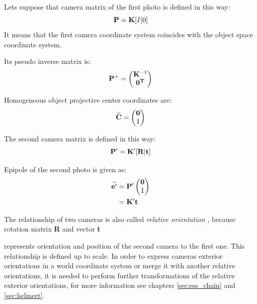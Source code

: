 \documentclass[a4paper,12pt]{article}
\newcommand{\ematr}[1]{%
{\bf #1}%
}
\newcommand{\evect}[1]{%
{\bf #1}%
}
\newcommand{\ehvect}[1]{%
{\bf \widetilde{#1}}%
}
\newcommand{\term}[1]{%
{\it #1}%
}
\begin{document}

Lets suppose that camera matrix of the first photo is defined in this way:
\begin{equation}
\ematr{P}  = \ematr{K} \ematr{[}I|0\ematr{]}
\end{equation}
It means that the first camera coordinate system coincides with  the object space coordinate 
system.

Its pseudo inverse matrix is:
\begin{equation}
\label{eq:rel_or_inv_cam1}
\ematr{P}^{+} =
\begin{pmatrix}
   \ematr{K}^{-1} \\
   \evect{0^{T}} \\
\end{pmatrix}
\end{equation}

Homogeneous object projective center coordinates are:
\begin{equation}
\label{eq:c1}
\ehvect{C} =
\begin{pmatrix}
   \evect{0} \\
    1 \\
\end{pmatrix}
\end{equation}

The second camera matrix is defined in this way:
\begin{equation}
\label{eq:rel_or_cam2}
\ematr{P}'  = \ematr{K}' \ematr{[}\ematr{R}|\evect{t}\ematr{]}
\end{equation}


Epipole of the second photo is given as:
\begin{equation}
\begin{split}
\label{eg:second_epipole}
\ehvect{e'} &=  \ematr{P'}
\begin{pmatrix}
   \evect{0} \\
    1 \\
\end{pmatrix} \\
&= \ematr{K}' \evect{t}\\
\end{split}
\end{equation}

The relationship of two cameras is also called \term{relative orientation}, because rotation matrix \ematr{R} and vector \evect{t}
represents orientation and position of the second camera to the first one. This relationship is defined up to scale.
In order to express cameras exterior orientations in a world coordinate 
system or merge it with another relative orientations, it is needed to perform further transformations of the relative 
exterior orientations, for more information see chapters \ref{sec:ess_chain} and \ref{sec:helmert}.
\end{document}
